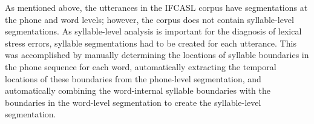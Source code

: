 	
	As mentioned above, the utterances in the IFCASL corpus have %
	segmentations at the phone and word levels; however, the corpus does not contain syllable-level segmentations.
	As syllable-level analysis is important for the diagnosis of lexical stress errors, syllable segmentations had to be created for each utterance. This was accomplished by 
	 manually determining the locations of syllable boundaries in the phone sequence for each word, 		%
	 automatically extracting the temporal locations of these %
	 boundaries
	 from the phone-level segmentation, 
	 and automatically combining the word-internal syllable boundaries with the boundaries in the word-level segmentation to create the syllable-level segmentation. 


	

	
%	
%

